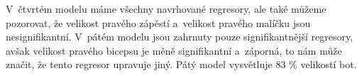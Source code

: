 \documentclass[twoside]{article}\usepackage[]{graphicx}\usepackage[]{color}
\begin{document}
V~čtvrtém modelu máme všechny navrhované regresory, ale také můžeme pozorovat, že velikost pravého zápěstí a~velikost pravého malíčku jsou nesignifikantní. V~pátém modelu jsou zahrnuty pouze signifikantnější regresory, avšak velikost pravého bicepsu je měně signifikantní a~záporná, to nám může značit, že tento regresor upravuje jiný. Pátý model vysvětluje 83 \% velikostí bot.
\end{document}
